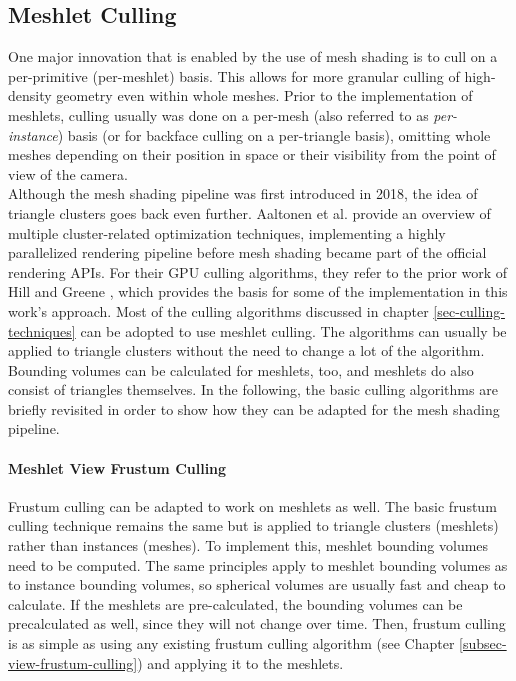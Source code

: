 \subsection*{Meshlet Culling} \label{subsec-meshlet-culling}

One major innovation that is enabled by the use of mesh shading is to cull on a per-primitive (per-meshlet) basis. 
This allows for more granular culling of high-density geometry even within whole meshes. Prior to the implementation 
of meshlets, culling usually was done on a per-mesh (also referred to as \emph{per-instance}) basis (or for backface 
culling on a per-triangle basis), omitting whole meshes depending on their position in space or their visibility from 
the point of view of the camera.\\

\noindent
Although the mesh shading pipeline was first introduced in 2018, the idea of triangle clusters goes back even further.
Aaltonen et al. \cite{Aaltonen2015} provide an overview of multiple cluster-related optimization techniques, implementing 
a highly parallelized rendering pipeline before mesh shading became part of the official rendering \ac{API}s.
For their \ac{GPU} culling algorithms, they refer to the prior work of Hill \cite{Hill11} and Greene \cite{Greene93}, which 
provides the basis for some of the implementation in this work's approach. Most of the culling algorithms discussed in chapter 
\ref{sec-culling-techniques} can be adopted to use meshlet culling. The algorithms can usually be applied to triangle clusters 
without the need to change a lot of the algorithm. Bounding volumes can be calculated for meshlets, too, and meshlets do also 
consist of triangles themselves. In the following, the basic culling algorithms are briefly revisited in order to show how they 
can be adapted for the mesh shading pipeline.


\paragraph*{Meshlet View Frustum Culling} \label{subsubsec-meshlet-view-frustum-culling}

Frustum culling can be adapted to work on meshlets as well. The basic frustum culling technique remains the same but 
is applied to triangle clusters (meshlets) rather than instances (meshes). To implement this, meshlet bounding volumes 
need to be computed. The same principles apply to meshlet bounding volumes as to instance bounding volumes, so spherical 
volumes are usually fast and cheap to calculate. If the meshlets are pre-calculated, the bounding volumes can be 
precalculated as well, since they will not change over time. Then, frustum culling is as simple as using any existing 
frustum culling algorithm (see Chapter \ref{subsec-view-frustum-culling}) and applying it to the meshlets. \\

